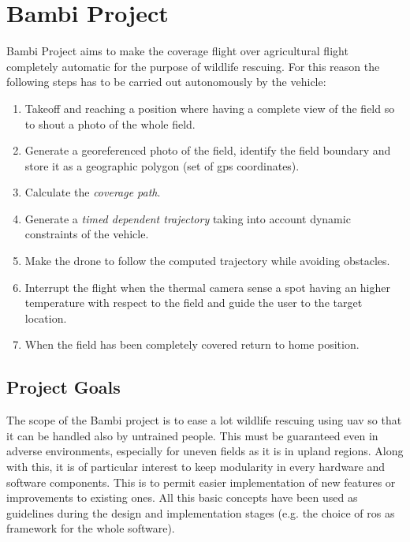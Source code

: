  \section{Bambi Project} %
 \label{sec:proposal_solution}
 Bambi Project aims to make the coverage flight over agricultural flight completely automatic for the purpose of wildlife rescuing. For this reason the following steps has to be carried out autonomously by the vehicle:
 \begin{enumerate}
   \item Takeoff and reaching a position where having a complete view of the field so to shout a photo of the whole field.
   \item Generate a georeferenced photo of the field, identify the field boundary and store it as a geographic polygon (set of \acrshort{gps} coordinates).
   \item Calculate the \textit{coverage path}.
   \item Generate a \textit{timed dependent trajectory} taking into account dynamic constraints of the vehicle.
   \item Make the drone to follow the computed trajectory while avoiding obstacles.
   \item Interrupt the flight when the thermal camera sense a spot having an higher temperature with respect to the field and guide the user to the target location.
   \item When the field has been completely covered return to home position.
 \end{enumerate}

 \subsection{Project Goals} %
 \label{sec:bambisaver_goals}
 The scope of the Bambi project is to ease a lot wildlife rescuing using \acrshort{uav} so that it can be handled also by untrained people. This must be guaranteed even in adverse environments, especially for uneven fields as it is in upland regions.
 Along with this, it is of particular interest to keep modularity in every hardware and software components. This is to permit easier implementation of new features or improvements to existing ones.
 All this basic concepts have been used as guidelines during the design and implementation stages (e.g. the choice of \acrshort{ros} as framework for the whole software).

